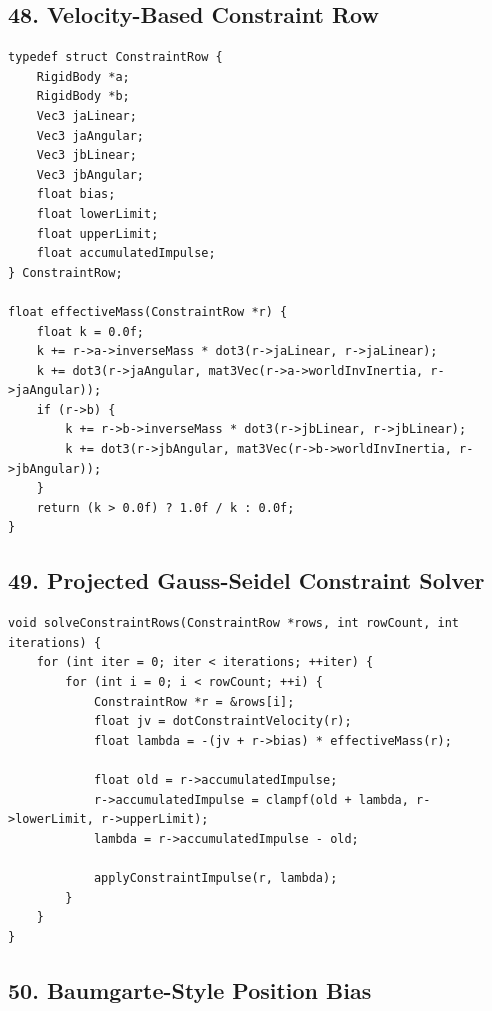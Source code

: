 \documentclass[10pt,letterpaper]{article}
\begin{document}
\subsection*{48. Velocity-Based Constraint Row}

\begin{verbatim}
typedef struct ConstraintRow {
    RigidBody *a;
    RigidBody *b;
    Vec3 jaLinear;
    Vec3 jaAngular;
    Vec3 jbLinear;
    Vec3 jbAngular;
    float bias;
    float lowerLimit;
    float upperLimit;
    float accumulatedImpulse;
} ConstraintRow;

float effectiveMass(ConstraintRow *r) {
    float k = 0.0f;
    k += r->a->inverseMass * dot3(r->jaLinear, r->jaLinear);
    k += dot3(r->jaAngular, mat3Vec(r->a->worldInvInertia, r->jaAngular));
    if (r->b) {
        k += r->b->inverseMass * dot3(r->jbLinear, r->jbLinear);
        k += dot3(r->jbAngular, mat3Vec(r->b->worldInvInertia, r->jbAngular));
    }
    return (k > 0.0f) ? 1.0f / k : 0.0f;
}
\end{verbatim}

\subsection*{49. Projected Gauss-Seidel Constraint Solver}

\begin{verbatim}
void solveConstraintRows(ConstraintRow *rows, int rowCount, int iterations) {
    for (int iter = 0; iter < iterations; ++iter) {
        for (int i = 0; i < rowCount; ++i) {
            ConstraintRow *r = &rows[i];
            float jv = dotConstraintVelocity(r);
            float lambda = -(jv + r->bias) * effectiveMass(r);

            float old = r->accumulatedImpulse;
            r->accumulatedImpulse = clampf(old + lambda, r->lowerLimit, r->upperLimit);
            lambda = r->accumulatedImpulse - old;

            applyConstraintImpulse(r, lambda);
        }
    }
}
\end{verbatim}

\subsection*{50. Baumgarte-Style Position Bias}
\end{document}
